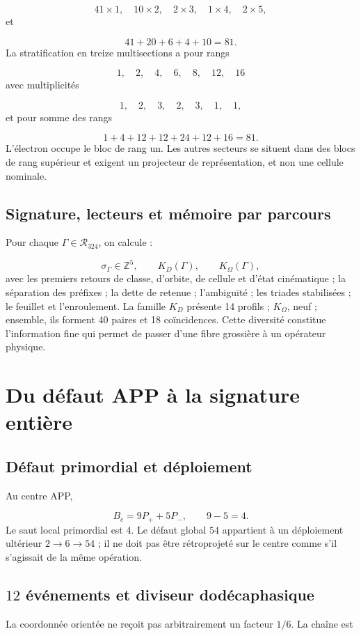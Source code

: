 \[
 41\times1,\quad10\times2,\quad2\times3,\quad1\times4,\quad2\times5,
\]
et

\[
 41+20+6+4+10=81.
\]
La stratification en treize multisections a pour rangs

\[
 1,\quad2,\quad4,\quad6,\quad8,\quad12,\quad16
\]
avec multiplicités

\[
 1,\quad2,\quad3,\quad2,\quad3,\quad1,\quad1,
\]
et pour somme des rangs

\[
 1+4+12+12+24+12+16=81.
\]
L'électron occupe le bloc de rang un. Les autres secteurs se situent dans des blocs de rang supérieur et exigent un projecteur de représentation, et non une cellule nominale.

\subsection{Signature, lecteurs et mémoire par parcours}
Pour chaque \(\Gamma\in\mathcal R_{324}\), on calcule :

\[
 \sigma_\Gamma\in\mathbb Z^5,\qquad
 K_D(\Gamma),\qquad K_\Omega(\Gamma),
\]
avec les premiers retours de classe, d'orbite, de cellule et d'état cinématique ; la séparation des préfixes ; la dette de retenue ; l'ambiguïté ; les triades stabilisées ; le feuillet et l'enroulement. La famille \(K_D\) présente 14 profils ; \(K_\Omega\), neuf ; ensemble, ils forment 40 paires et 18 coïncidences. Cette diversité constitue l'information fine qui permet de passer d'une fibre grossière à un opérateur physique.

\section{Du défaut APP à la signature entière}
\subsection{Défaut primordial et déploiement}
Au centre APP,

\[
 B_c=9P_++5P_-,\qquad 9-5=4.
\]
Le saut local primordial est 4. Le défaut global \(54\) appartient à un déploiement ultérieur \(2\to6\to54\) ; il ne doit pas être rétroprojeté sur le centre comme s'il s'agissait de la même opération.

\subsection{\(12\) événements et diviseur dodécaphasique}
La coordonnée orientée ne reçoit pas arbitrairement un facteur \(1/6\). La chaîne est

